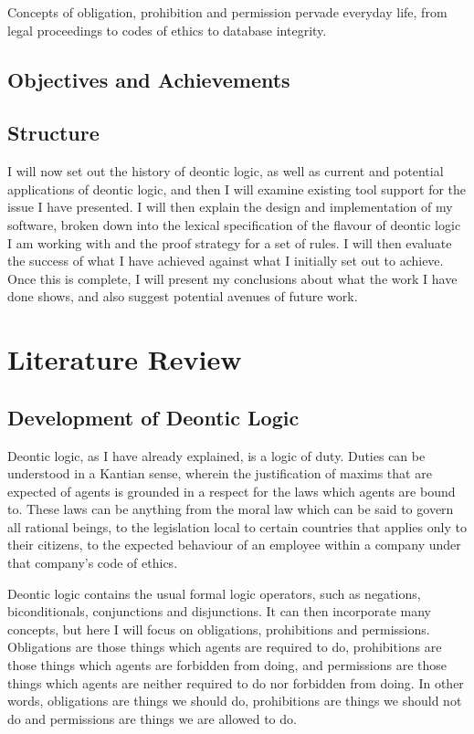 \documentclass{l4proj}
\begin{document}
Concepts of obligation, prohibition and permission pervade everyday life, from legal proceedings to codes of ethics to database integrity. 


\section{Objectives and Achievements} %

\section{Structure}
I will now set out the history of deontic logic, as well as current and potential applications of deontic logic, and then I will examine existing tool support for the issue I have presented. I will then explain the design and implementation of my software, broken down into the lexical specification of the flavour of deontic logic I am working with and the proof strategy for a set of rules. I will then evaluate the success of what I have achieved against what I initially set out to achieve. Once this is complete, I will present my conclusions about what the work I have done shows, and also suggest potential avenues of future work. 

\chapter{Literature Review}

\section{Development of Deontic Logic}%
Deontic logic, as I have already explained, is a logic of duty. Duties can be understood in a Kantian sense, wherein the justification of maxims that are expected of agents is grounded in a respect for the laws which agents are bound to\cite{sep-kant-moral}. These laws can be anything from the moral law which can be said to govern all rational beings, to the legislation local to certain countries that applies only to their citizens, to the expected behaviour of an employee within a company under that company's code of ethics. 

Deontic logic contains the usual formal logic operators, such as negations, biconditionals, conjunctions and disjunctions. It can then incorporate many concepts, but here I will focus on obligations, prohibitions and permissions. Obligations are those things which agents are required to do, prohibitions are those things which agents are forbidden from doing, and permissions are those things which agents are neither required to do nor forbidden from doing. In other words, obligations are things we should do, prohibitions are things we should not do and permissions are things we are allowed to do. 
\end{document}
